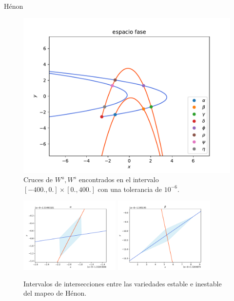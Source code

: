 \documentclass[11pt]{beamer}
\theoremstyle{definition}
\begin{document}
\begin{frame}{H\'enon}
\begin{figure}
\centering
\includegraphics[scale=0.5]{crucesL}
\caption{Cruces de $W^{u},W^{s}$ encontrados en el intervalo $[-400.,0.] \times [0.,400.]$ con una tolerancia de $10^{-6}$.}
\label{crucesH}
\end{figure}
\end{frame}

\begin{frame}
\begin{figure}
\includegraphics[width=50mm]{alpha}
\includegraphics[width=50mm]{beta}
\caption{Intervalos de intersecciones entre las variedades estable e inestable del mapeo de Hénon.} 
\label{matriz_cortes}
\end{figure}
\end{frame}
\end{document}
